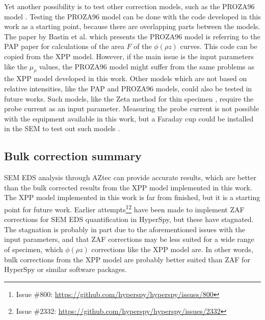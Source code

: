 Yet another possibility is to test other correction models, such as the PROZA96 model \cite{bastin_proza96_1998}.
Testing the PROZA96 model can be done with the code developed in this work as a starting point, because there are overlapping parts between the models.
The paper by Bastin et al. \cite{bastin_proza96_1998} which presents the PROZA96 model is referring to the PAP paper for calculations of the area $F$ of the $\phi(\rho z)$ curves.
This code can be copied from the XPP model.
However, if the main issue is the input parameters like the $\mu_\rho$ values, the PROZA96 model might suffer from the same problems as the XPP model developed in this work.
Other models which are not based on relative intensities, like the PAP and PROZA96 models, could also be tested in future works.
Such models, like the Zeta method for thin specimen \cite[Ch. 35.5]{williams_carter_tem_2009}, require the probe current as an input parameter.
Measuring the probe current is not possible with the equipment available in this work, but a Faraday cup could be installed in the SEM to test out such models \cite{goldstein_scanning_2018}.












\subsection{Bulk correction summary}
\label{discussion:quantitative:summary}


SEM EDS analysis through AZtec can provide accurate results, which are better than the bulk corrected results from the XPP model implemented in this work.
The XPP model implemented in this work is far from finished, but it is a starting point for future work.
Earlier attempts\footnote{Issue \#800: \url{https://github.com/hyperspy/hyperspy/issues/800}}\footnote{Issue \#2332: \url{https://github.com/hyperspy/hyperspy/issues/2332}} have been made to implement ZAF corrections for SEM EDS quantification in HyperSpy, but these have stagnated.
The stagnation is probably in part due to the aforementioned issues with the input parameters, and that ZAF corrections may be less suited for a wide range of specimen, which $\phi (\rho z)$ corrections like the XPP model are.
In other words, bulk corrections from the XPP model are probably better suited than ZAF for HyperSpy or similar software packages.


